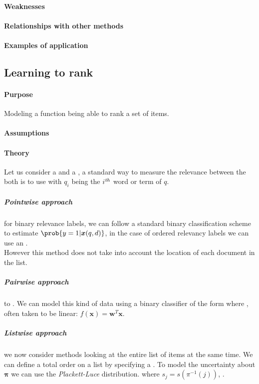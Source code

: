 \paragraph{Weaknesses}
\paragraph{Relationships with other methods}
\paragraph{Examples of application}


\subsection{Learning to rank}
\paragraph{Purpose}
Modeling a function being able to rank a set of items.

\paragraph{Assumptions}
\paragraph{Theory}
Let us consider a  and a , a standard way to measure the relevance
between the both is to use  with $q_{i}$ being the $i^{\text{\emph{th}}}$ word or term of $q$.
\subparagraph{Pointwise approach}
for binary relevance labels, we can follow a standard binary classification scheme to
estimate $\prob{y=1|\bm{x}(q,d)}$, in the case of ordered relevancy labels we can use
an .\\
However this method does not take into account the location of each document in the 
list.
\subparagraph{Pairwise approach}
to . We 
can model this kind of data using a binary classifier of the form  
where , often taken to be linear: $f(\bm{x}) = \bm{w}^{T}
\bm{x}$.

\subparagraph{Listwise approach}
we now consider methods looking at the entire list of items at the same time. We can 
define a total order on a list by specifying a .
To model the uncertainty about $\bm{\pi}$ we can use the \emph{Plackett-Luce} 
distribution.  where
$s_{j}=s\left(\pi^{-1}(j)\right)$, .
